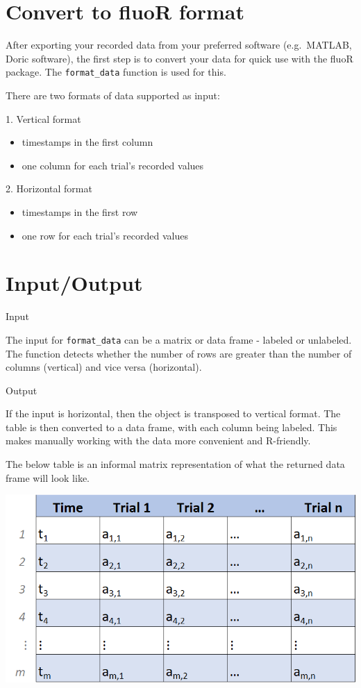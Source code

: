 \documentclass[
]{book}
\providecommand{\tightlist}{%
  \setlength{\itemsep}{0pt}\setlength{\parskip}{0pt}}
\begin{document}
\hypertarget{intro-convert}{%
\section{Convert to fluoR format}\label{intro-convert}}

After exporting your recorded data from your preferred software (e.g.~MATLAB, Doric software), the first step is to convert your data for quick use with the fluoR package. The \texttt{format\_data} function is used for this.

There are two formats of data supported as input:

1. Vertical format

\begin{itemize}
\tightlist
\item
  timestamps in the first column
\item
  one column for each trial's recorded values
\end{itemize}

2. Horizontal format

\begin{itemize}
\tightlist
\item
  timestamps in the first row
\item
  one row for each trial's recorded values
\end{itemize}

\hypertarget{intro-inout}{%
\section{Input/Output}\label{intro-inout}}

Input

The input for \texttt{format\_data} can be a matrix or data frame - labeled or unlabeled. The function detects whether the number of rows are greater than the number of columns (vertical) and vice versa (horizontal).

Output

If the input is horizontal, then the object is transposed to vertical format. The table is then converted to a data frame, with each column being labeled. This makes manually working with the data more convenient and R-friendly.

The below table is an informal matrix representation of what the returned data frame will look like.

\includegraphics{./external_figures/fluoR_format_table_example.png}
\end{document}
